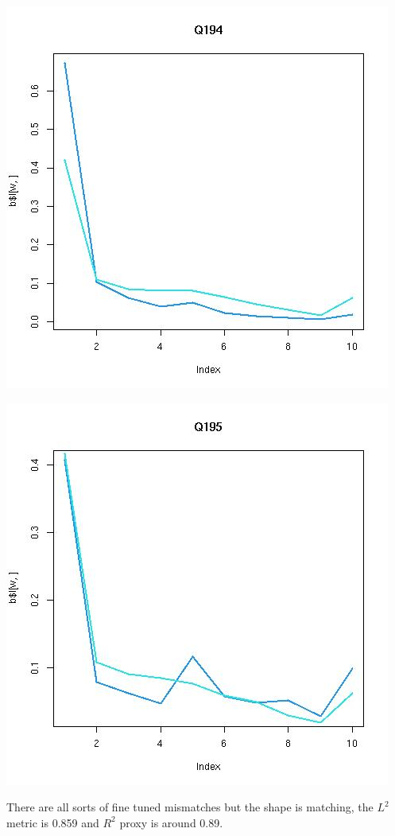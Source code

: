 \documentclass{amsart}
\begin{document}
\includegraphics[scale=0.6]{fitQ194.jpeg}

\includegraphics[scale=0.6]{fitQ195.jpeg}

There are all sorts of fine tuned mismatches but the shape is matching, the $L^2$ metric is 0.859 and $R^2$ proxy is around 0.89.  
\end{document}
